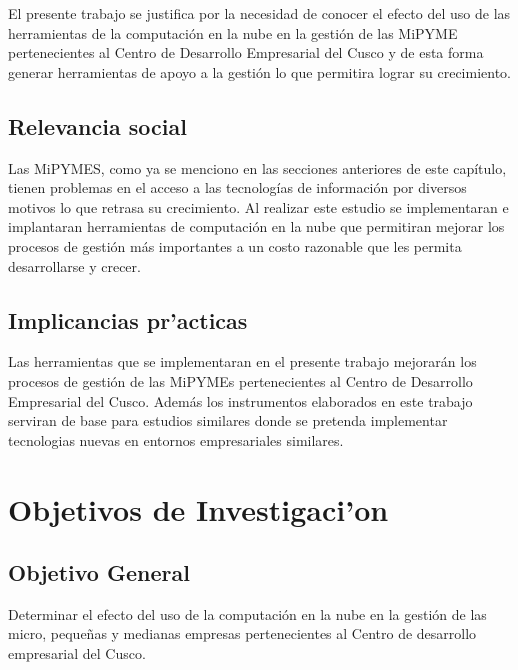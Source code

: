 El presente trabajo se justifica por la necesidad de conocer el efecto del uso
de las herramientas de la computaci\'on en la nube en la gesti\'on de las MiPYME
pertenecientes al Centro de Desarrollo Empresarial del Cusco y de esta forma
generar herramientas de apoyo a la gesti\'on lo que permitira lograr su crecimiento.

\subsection{Relevancia social}
Las MiPYMES, como ya se menciono en las secciones anteriores de este cap\'itulo,
tienen problemas en el acceso a las tecnolog\'ias de informaci\'on por diversos motivos
lo que retrasa su crecimiento. Al realizar este estudio se implementaran e implantaran
herramientas de computaci\'on en la nube que permitiran mejorar los procesos de gesti\'on
m\'as importantes a un costo razonable que les permita desarrollarse y crecer.

\subsection{Implicancias pr'acticas}
Las herramientas que se implementaran en el presente trabajo mejorar\'an los procesos
de gesti\'on de las MiPYMEs pertenecientes al Centro de Desarrollo Empresarial del Cusco.
Adem\'as los instrumentos elaborados en este trabajo serviran de base para estudios
similares donde se pretenda implementar tecnologias nuevas en entornos empresariales
similares.


\section{Objetivos de Investigaci'on}
\subsection{Objetivo General}
Determinar el efecto del uso de la computaci\'on en la nube en la gesti\'on de
las micro, peque\~nas y medianas empresas pertenecientes al Centro de desarrollo
empresarial del Cusco.
